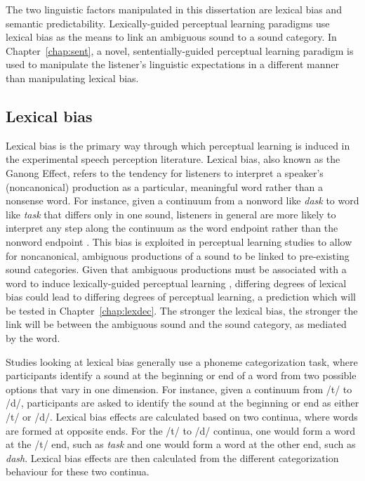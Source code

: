 The two linguistic factors manipulated in this dissertation are lexical bias and semantic predictability.  
Lexically-guided perceptual learning paradigms use lexical bias as the means to link an ambiguous sound to a sound category.
In Chapter~\ref{chap:sent}, a novel, sententially-guided perceptual learning paradigm is used to manipulate the listener's linguistic expectations in a different manner than manipulating lexical bias.

\subsection{Lexical bias}
\label{sec:lexicalbias}

Lexical bias is the primary way through which perceptual learning is induced in the experimental speech perception literature.
Lexical bias, also known as the Ganong Effect, refers to the tendency for listeners to interpret a speaker's (noncanonical) production as a particular, meaningful word rather than a nonsense word.  
For instance, given a continuum from a nonword like \emph{dask} to word like \emph{task} that differs only in one sound, listeners in general are more likely to interpret any step along the continuum as the word endpoint rather than the nonword endpoint \citep{Ganong1980}. 
This bias is exploited in perceptual learning studies to allow for noncanonical, ambiguous productions of a sound to be linked to pre-existing sound categories.
Given that ambiguous productions must be associated with a word to induce lexically-guided perceptual learning \citep{Norris2003}, differing degrees of lexical bias could lead to differing degrees of perceptual learning, a prediction which will be tested in Chapter~\ref{chap:lexdec}.  
The stronger the lexical bias, the stronger the link will be between the ambiguous sound and the sound category, as mediated by the word.

Studies looking at lexical bias generally use a phoneme categorization task, where participants identify a sound at the beginning or end of a word from two possible options that vary in one dimension.  
For instance, given a continuum from /t/ to /d/, participants are asked to identify the sound at the beginning or end as either /t/ or /d/. 
Lexical bias effects are calculated based on two continua, where words are formed at opposite ends. 
For the /t/ to /d/ continua, one would form a word at the /t/ end, such as \emph{task} and one would form a word at the other end, such as \emph{dash}.  
Lexical bias effects are then calculated from the different categorization behaviour for these two continua.

